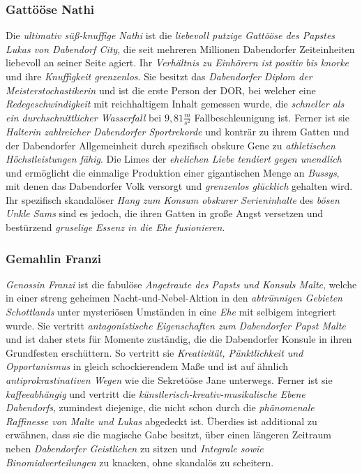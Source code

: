 \subsubsection{{Gattööse Nathi}}
Die \textit{ultimativ süß-knuffige Nathi} ist die \textit{liebevoll putzige Gattööse des Papstes Lukas von Dabendorf City}, die seit mehreren Millionen Dabendorfer Zeiteinheiten liebevoll an seiner Seite agiert. Ihr \textit{Verhältnis zu Einhörern ist positiv bis knorke} und ihre \textit{Knuffigkeit grenzenlos}. Sie besitzt das \textit{Dabendorfer Diplom der Meisterstochastikerin} und ist die erste Person der DOR, bei welcher eine \textit{Redegeschwindigkeit} mit reichhaltigem Inhalt gemessen wurde, die \textit{schneller als ein durchschnittlicher Wasserfall} bei $9,81 \frac{m}{s^2}$ Fallbeschleunigung ist. Ferner ist sie \textit{Halterin zahlreicher Dabendorfer Sportrekorde} und konträr zu ihrem Gatten und der Dabendorfer Allgemeinheit durch spezifisch obskure Gene zu \textit{athletischen Höchstleistungen fähig}. Die Limes der \textit{ehelichen Liebe tendiert gegen unendlich} und ermöglicht die einmalige Produktion einer gigantischen Menge an \textit{Bussys}, mit denen das Dabendorfer Volk versorgt und \textit{grenzenlos glücklich} gehalten wird. Ihr spezifisch skandalöser \textit{Hang zum Konsum obskurer Serieninhalte} des \textit{bösen Unkle Sams} sind es jedoch, die ihren Gatten in große Angst versetzen und bestürzend \textit{gruselige Essenz in die Ehe fusionieren}.

\subsubsection{{Gemahlin Franzi}}
\textit{Genossin Franzi} ist die fabulöse \textit{Angetraute des Papsts und Konsuls Malte}, welche in einer streng geheimen Nacht-und-Nebel-Aktion in den \textit{abtrünnigen Gebieten Schottlands} unter mysteriösen Umständen in eine \textit{Ehe} mit selbigem integriert wurde. Sie vertritt \textit{antagonistische Eigenschaften zum Dabendorfer Papst Malte} und ist daher stets für Momente zuständig, die die Dabendorfer Konsule in ihren Grundfesten erschüttern. So vertritt sie \textit{Kreativität, Pünktlichkeit und Opportunismus} in gleich schockierendem Maße und ist auf ähnlich \textit{antiprokrastinativen Wegen} wie die Sekretööse Jane unterwegs. Ferner ist sie \textit{kaffeeabhängig} und vertritt die \textit{künstlerisch-kreativ-musikalische Ebene Dabendorfs}, zumindest diejenige, die nicht schon durch die \textit{phänomenale Raffinesse von Malte und Lukas} abgedeckt ist. Überdies ist additional zu erwähnen, dass sie die magische Gabe besitzt, über einen längeren Zeitraum neben \textit{Dabendorfer Geistlichen} zu sitzen und \textit{Integrale sowie Binomialverteilungen} zu knacken, ohne skandalös zu scheitern.

